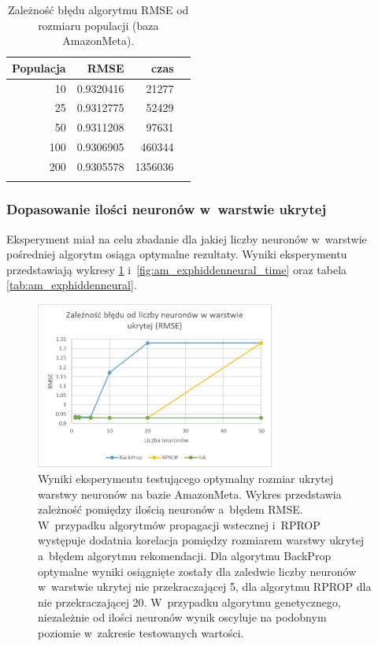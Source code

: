 \documentclass[twoside]{iisthesis}
\begin{document}
			\begin{longtable}{r||rrr}
				\label{tab:am_exppopulation}
				\centering
				\textbf{Populacja} & \textbf{RMSE} & \textbf{czas} \\
				\hline
				10        & 0.9320416  & 21277 \\
				25        & 0.9312775  & 52429 \\
				50        & 0.9311208  & 97631 \\
				100       & 0.9306905  & 460344 \\
				200       & 0.9305578  & 1356036 \\
				\caption{Zależność błędu algorytmu RMSE od rozmiaru populacji (baza AmazonMeta).}
			\end{longtable}
			
			\subsubsection{Dopasowanie ilości neuronów w~warstwie ukrytej}
			
				Eksperyment miał na celu zbadanie dla jakiej liczby neuronów w~warstwie pośredniej algorytm osiąga optymalne rezultaty. Wyniki eksperymentu przedstawiają wykresy \ref{fig:am_exphiddenneural_rmse} i~\ref{fig:am_exphiddenneural_time} oraz tabela \ref{tab:am_exphiddenneural}. 
			
				\begin{figure}[H]
					\centering
					\includegraphics[width=0.7\textwidth]{am_exphiddenneural_rmse}
					\caption{Wyniki eksperymentu testującego optymalny rozmiar ukrytej warstwy neuronów na bazie AmazonMeta. Wykres przedstawia zależność pomiędzy ilością neuronów a~błędem RMSE. W~przypadku algorytmów propagacji wstecznej i~RPROP występuje dodatnia korelacja pomiędzy rozmiarem warstwy ukrytej a~błędem algorytmu rekomendacji. Dla algorytmu BackProp optymalne wyniki osiągnięte zostały dla zaledwie liczby neuronów w~warstwie ukrytej nie przekraczającej 5, dla algorytmu RPROP dla nie przekraczającej 20. W~przypadku algorytmu genetycznego, niezależnie od ilości neuronów wynik oscyluje na podobnym poziomie w~zakresie testowanych wartości.}
					\label{fig:am_exphiddenneural_rmse}
				\end{figure}
				
\end{document}
